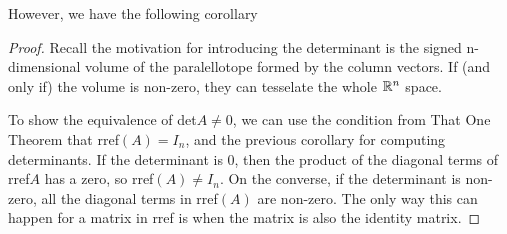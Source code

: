 However, we have the following corollary 
\begin{proof}
	Recall the motivation for introducing the determinant is the signed n-dimensional volume of the paralellotope formed by the column vectors. If (and only if) the volume is non-zero, they can tesselate the whole $\mathbb{R}^n$ space.

	To show the equivalence of det$A\neq 0$, we can use the condition from That One Theorem that rref$(A)=I_n$, and the previous corollary for computing determinants. If the determinant is $0$, then the product of the diagonal terms of rref$A$ has a zero, so rref$(A)\neq I_n$. On the converse, if the determinant is non-zero, all the diagonal terms in rref$(A)$ are non-zero. The only way this can happen for a matrix in rref is when the matrix is also the identity matrix.
\end{proof}
